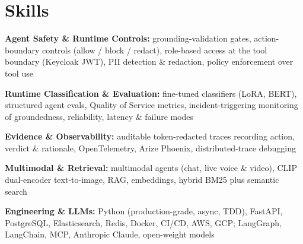 \documentclass[10pt,a4paper]{article}
\begin{document}
\section{Skills}
\begin{tight}
  \item[\textcolor{accent}{\small$\bullet$}] \textbf{Agent Safety \& Runtime Controls:} grounding-validation gates, action-boundary controls (allow / block / redact), role-based access at the tool boundary (Keycloak JWT), PII detection \& redaction, policy enforcement over tool use
  \item[\textcolor{accent}{\small$\bullet$}] \textbf{Runtime Classification \& Evaluation:} fine-tuned classifiers (LoRA, BERT), structured agent evals, Quality of Service metrics, incident-triggering monitoring of groundedness, reliability, latency \& failure modes
  \item[\textcolor{accent}{\small$\bullet$}] \textbf{Evidence \& Observability:} auditable token-redacted traces recording action, verdict \& rationale, OpenTelemetry, Arize Phoenix, distributed-trace debugging
  \item[\textcolor{accent}{\small$\bullet$}] \textbf{Multimodal \& Retrieval:} multimodal agents (chat, live voice \& video), CLIP dual-encoder text-to-image, RAG, embeddings, hybrid BM25 plus semantic search
  \item[\textcolor{accent}{\small$\bullet$}] \textbf{Engineering \& LLMs:} Python (production-grade, async, TDD), FastAPI, PostgreSQL, Elasticsearch, Redis, Docker, CI/CD, AWS, GCP; LangGraph, LangChain, MCP, Anthropic Claude, open-weight models
\end{tight}

\end{document}
